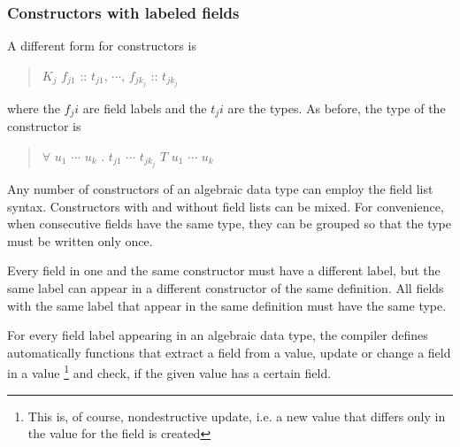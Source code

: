 \subsubsection{Constructors with labeled fields} \label{fieldconstructor}

A different form for constructors is

\begin{quote}
$K_j$ \bracea{} $f_{j1}$ :: $t_{j1}$, $\cdots$, $f_{j{k_j}}$ :: $t_{j{k_j}}$ \bracez{}
\end{quote}

where the $f_ji$ are field labels and the $t_ji$ are the types. 
As before, the type of the constructor is

\begin{quote}
$\forall$ $u_1$ $\cdots$ $u_k$ . $t_{j1}$ \arrow{} $\cdots$ \arrow{} $t_{jk_j}$ \arrow{} $T$ $u_1$ $\cdots$ $u_k$
\end{quote}

Any number of constructors of an algebraic data type can employ the field list syntax. 
Constructors with and without field lists can be mixed.
For convenience, when consecutive fields have the same type, they can be grouped so that the type must be written only once.



Every field in one and the same constructor must have a different label, but the same label can appear in a different constructor of the same  definition. 
All fields with the same label that appear in the same  definition must have the same type.


For every field label appearing in an algebraic data type, 
the compiler defines automatically functions that extract a field from a value,
update or change a field in a value
\footnote{This is, of course, nondestructive update, i.e. a new value that differs only in the value for the field is created} 
and check, if the given value has a certain field.


